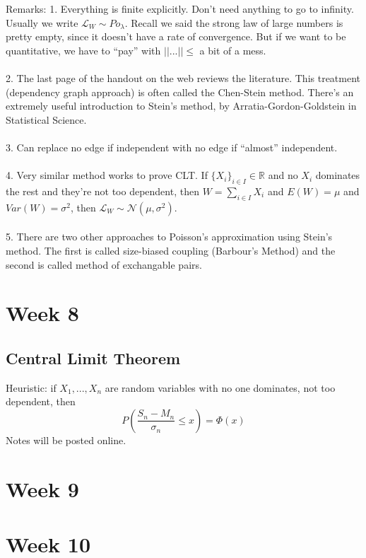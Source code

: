 \documentclass[12pt]{article}
\begin{document}
Remarks:  1.  Everything is finite explicitly.  Don't need anything to go to infinity.  Usually we write $ \mathcal{L}_W \sim Po_\lambda$.  Recall we said the strong law of large numbers is pretty empty, since it doesn't have a rate of convergence.  But if we want to be quantitative, we have to ``pay'' with $|| ... || \le $ a bit of a mess.
\\ \\
2.  The last page of the handout on the web reviews the literature.  This treatment (dependency graph approach) is often called the Chen-Stein method.  There's an extremely useful introduction to Stein's method, by Arratia-Gordon-Goldstein in Statistical Science.
\\ \\
3.  Can replace no edge if independent with no edge if ``almost'' independent.
\\ \\
4.  Very similar method works to prove CLT.  If $\{X_i\}_{i \in I} \in \mathbb{R}$ and no $X_i$ dominates the rest and they're not too dependent, then $W = \sum_{i \in I} X_i$ and $E(W) = \mu$ and $Var(W) = \sigma^2$, then $\mathcal{L}_W \sim \mathcal{N}(\mu, \sigma^2)$.
\\ \\
5.  There are two other approaches to Poisson's approximation using Stein's method.  The first is called size-biased coupling (Barbour's Method) and the second is called method of exchangable pairs.


\section{Week 8}
\subsection{Central Limit Theorem}
Heuristic: if $X_1, ..., X_n$ are random variables with no one dominates, not too dependent, then
$$P( \frac{S_n - M_n}{\sigma_n} \le x ) = \Phi(x) $$
Notes will be posted online.


\section{Week 9}


\section{Week 10}


\newpage
\begin{thebibliography}{99}

\end{thebibliography}
\end{document}
